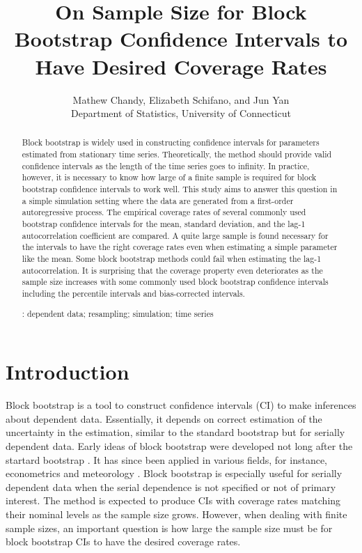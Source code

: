\documentclass[12pt, letterpaper, titlepage]{article}
\title{On Sample Size for Block Bootstrap Confidence Intervals 
  to Have Desired Coverage Rates}
\author{Mathew Chandy, Elizabeth Schifano,
  and Jun Yan\\[1ex]
  Department of Statistics, University of Connecticut\\
}
\date{}
\begin{document}
 
\maketitle


\begin{abstract}
Block bootstrap is widely used in constructing confidence intervals for
parameters estimated from stationary time series. Theoretically, the method
should provide valid confidence intervals as the length of the time series goes
to infinity. In practice, however, it is necessary to know how large of a
finite sample is required for block bootstrap confidence intervals to work
well. This study aims to answer this question in a simple simulation setting
where the data are generated from a first-order autoregressive process. The
empirical coverage rates of several commonly used bootstrap confidence
intervals for the mean, standard deviation, and the lag-1 autocorrelation
coefficient are compared. A quite large sample is found necessary for the
intervals to have the right coverage rates even when estimating a simple
parameter like the mean. Some block bootstrap methods could fail when
estimating the lag-1 autocorrelation. It is surprising that the coverage
property even deteriorates as the sample size increases with some commonly
used block bootstrap confidence intervals including the percentile intervals
and bias-corrected intervals.


\bigskip
{}:
dependent data; resampling; simulation; time series
\end{abstract}


\doublespace


\section{Introduction}
\label{sec:intro}


Block bootstrap is a tool to construct confidence intervals (CI) to make
inferences about dependent data. Essentially, it depends on correct estimation
of the uncertainty in the estimation, similar to the standard bootstrap
\citep{efron1979bootstrap} but for serially dependent data. Early ideas of block
bootstrap were developed not long after the startard bootstrap 
\citep{hall1985resampling, carlstein1986use,kunsch1989jackknife}. It has since
been applied in various fields, for instance, econometrics
\citep{mackinnon2006bootstrap} and meteorology \citep{varga2017generalised}.
Block bootstrap is especially useful for serially dependent data when the
serial dependence is not specified or not of primary interest. The method is
expected to produce CIs with coverage rates matching their nominal levels as
the sample size grows. However, when dealing with finite sample sizes, an
important question is how large the sample size must be for block bootstrap
CIs to have the desired coverage rates.
\end{document}
